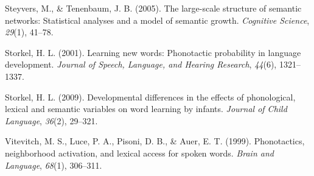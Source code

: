 \documentclass[10pt, letterpaper]{article}
\begin{document}
\hypertarget{ref-steyvers2005}{}
Steyvers, M., \& Tenenbaum, J. B. (2005). The large-scale structure of
semantic networks: Statistical analyses and a model of semantic growth.
\emph{Cognitive Science}, \emph{29}(1), 41--78.

\hypertarget{ref-storkel2001}{}
Storkel, H. L. (2001). Learning new words: Phonotactic probability in
language development. \emph{Journal of Speech, Language, and Hearing
Research}, \emph{44}(6), 1321--1337.

\hypertarget{ref-storkel2009}{}
Storkel, H. L. (2009). Developmental differences in the effects of
phonological, lexical and semantic variables on word learning by
infants. \emph{Journal of Child Language}, \emph{36}(2), 29--321.

\hypertarget{ref-vitevitch1999}{}
Vitevitch, M. S., Luce, P. A., Pisoni, D. B., \& Auer, E. T. (1999).
Phonotactics, neighborhood activation, and lexical access for spoken
words. \emph{Brain and Language}, \emph{68}(1), 306--311.
\end{document}
